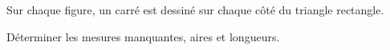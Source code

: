     Sur chaque figure, un carré est dessiné sur chaque côté du triangle rectangle.

    Déterminer les mesures manquantes, aires et longueurs.

    \hspace*{-8mm}\hspace*{-3mm}
